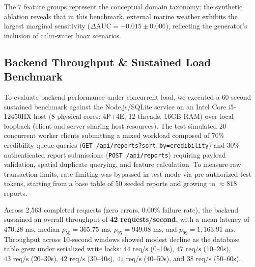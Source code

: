 \documentclass[conference]{IEEEtran}
\begin{document}
The 7 feature groups represent the conceptual domain taxonomy; the synthetic ablation reveals that in this benchmark, external marine weather exhibits the largest marginal sensitivity ($\Delta\text{AUC} = -0.015 \pm 0.006$), reflecting the generator's inclusion of calm-water hoax scenarios.

\subsection{Backend Throughput \& Sustained Load Benchmark}
To evaluate backend performance under concurrent load, we executed a 60-second sustained benchmark against the Node.js/SQLite service on an Intel Core i5-12450HX host (8 physical cores: 4P+4E, 12 threads, 16GB RAM) over local loopback (client and server sharing host resources). The test simulated 20 concurrent worker clients submitting a mixed workload composed of 70\% credibility queue queries (\texttt{GET /api/reports?sort\_by=credibility}) and 30\% authenticated report submissions (\texttt{POST /api/reports}) requiring payload validation, spatial duplicate querying, and feature calculation. To measure raw transaction limits, rate limiting was bypassed in test mode via pre-authorized test tokens, starting from a base table of 50 seeded reports and growing to $\approx 818$ reports.

Across 2,563 completed requests (zero errors, 0.00\% failure rate), the backend sustained an overall throughput of \textbf{42 requests/second}, with a mean latency of $470.28\text{ ms}$, median $p_{50} = 365.75\text{ ms}$, $p_{95} = 949.08\text{ ms}$, and $p_{99} = 1,163.91\text{ ms}$. Throughput across 10-second windows showed modest decline as the database table grew under serialized write locks: $44\text{ req/s}$ (0--10s), $47\text{ req/s}$ (10--20s), $43\text{ req/s}$ (20--30s), $42\text{ req/s}$ (30--40s), $41\text{ req/s}$ (40--50s), and $38\text{ req/s}$ (50--60s).
\end{document}
